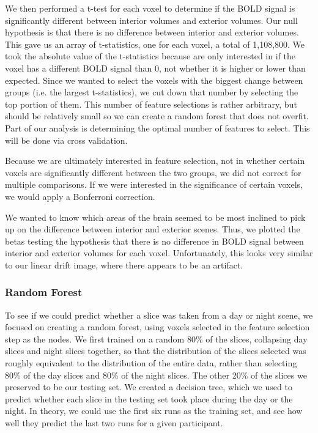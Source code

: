 \documentclass[11pt]{article}
\begin{document}
We then performed a t-test for each voxel to determine if the BOLD signal is
significantly different between interior volumes and exterior volumes.  Our null 
hypothesis is that there is no difference between interior and exterior volumes.
This gave us an array of t-statistics, one for each voxel, a total of 1,108,800.
We took the absolute value of the t-statistics because are only interested in
if the voxel has a different BOLD signal than 0, not whether it is higher or 
lower than expected. Since we wanted to select the voxels with the biggest 
change between groups (i.e. the largest t-statistics), we cut down that
number by selecting the top portion of them.  This number of feature
selections is rather arbitrary, but should be relatively small so we can
create a random forest that does not overfit.  Part of our analysis is
determining the optimal number of features to select. This will be done via
cross validation.

Because we are ultimately interested in feature selection, not in whether
certain voxels are significantly different between the two groups, we did not
correct for multiple comparisons.  If we were interested in the significance
of certain voxels, we would apply a Bonferroni correction.

We wanted to know which areas of the brain seemed to be most inclined to pick
up on the difference between interior and exterior scenes.  Thus, we plotted the 
betas testing the hypothesis that there is no difference in BOLD signal between 
interior and exterior volumes for each voxel.  Unfortunately, this looks very similar to our linear drift image, where there appears to be an artifact.


\subsubsection{Random Forest}

To see if we could predict whether a slice was taken from a day or night
scene, we focused on creating a random forest, using voxels selected in the 
feature selection step as the nodes.  We first trained on a random 80\% of the 
slices, collapsing day slices and night slices together, so that the distribution of
the slices selected was roughly equivalent to the distribution of the entire
data, rather than selecting 80\% of the day slices and 80\% of the night
slices.  The other 20\% of the slices we preserved to be our testing set.  We
created a decision tree, which we used to predict whether each slice in the
testing set took place during the day or the night.  In theory, we could use
the first six runs as the training set, and see how well they predict the last
two runs for a given participant.
\end{document}
